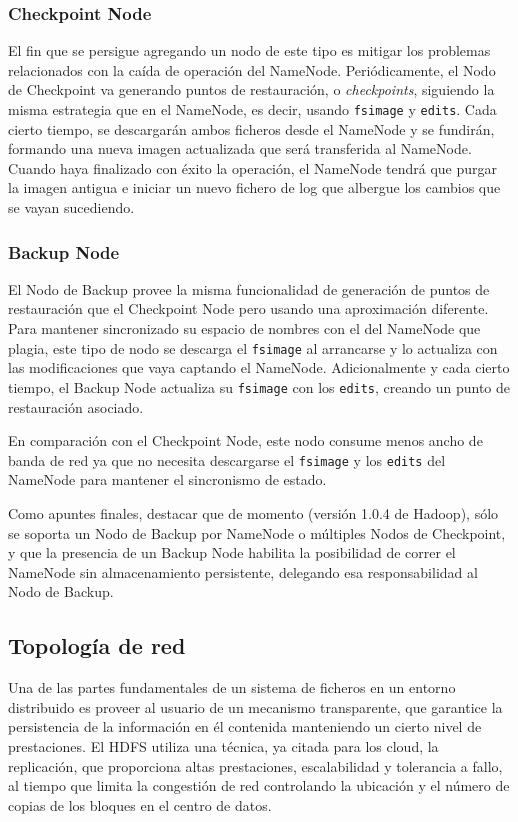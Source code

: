\subsubsection{Checkpoint Node}\label{subsubsec:checkpointnode}
\noindent El fin que se persigue agregando un nodo de este tipo es mitigar los problemas relacionados con la ca\'ida de operaci\'on del NameNode. Peri\'odicamente, el Nodo de Checkpoint va generando puntos de restauraci\'on, o \emph{checkpoints}, siguiendo la misma estrategia que en el NameNode, es decir, usando \texttt{fsimage} y \texttt{edits}. Cada cierto tiempo, se descargar\'an ambos ficheros desde el NameNode y se fundir\'an, formando una nueva imagen actualizada que ser\'a transferida al NameNode. Cuando haya finalizado con \'exito la operaci\'on, el NameNode tendr\'a que purgar la imagen antigua e iniciar un nuevo fichero de log que albergue los cambios que se vayan sucediendo.


\subsubsection{Backup Node}\label{subsubsec:backupnode}
\noindent El Nodo de Backup provee la misma funcionalidad de generaci\'on de puntos de restauraci\'on que el Checkpoint Node pero usando una aproximaci\'on diferente. Para mantener sincronizado su espacio de nombres con el del NameNode que plagia, este tipo de nodo se descarga el \texttt{fsimage} al arrancarse y lo actualiza con las modificaciones que vaya captando el NameNode. Adicionalmente y cada cierto tiempo, el Backup Node actualiza su \texttt{fsimage} con los \texttt{edits}, creando un punto de restauraci\'on asociado.\newline

En comparaci\'on con el Checkpoint Node, este nodo consume menos ancho de banda de red ya que no necesita descargarse el \texttt{fsimage} y los \texttt{edits} del NameNode para mantener el sincronismo de estado.\newline

Como apuntes finales, destacar que de momento (versi\'on 1.0.4 de Hadoop), s\'olo se soporta un Nodo de Backup por NameNode o m\'ultiples Nodos de Checkpoint, y que la presencia de un Backup Node habilita la posibilidad de correr el NameNode sin almacenamiento persistente, delegando esa res\-pon\-sa\-bi\-li\-dad al Nodo de Backup.


\subsection{Topolog\'ia de red}\label{subsec:topologiared}
\noindent Una de las partes fundamentales de un sistema de ficheros en un entorno distribuido es proveer al usuario de un mecanismo transparente, que garantice la persistencia de la informaci\'on en \'el contenida manteniendo un cierto nivel de prestaciones. El HDFS utiliza una t\'ecnica, ya citada para los cloud, la replicaci\'on, que proporciona altas prestaciones, escalabilidad y tolerancia a fallo, al tiempo que limita la congesti\'on de red controlando la ubicaci\'on y el n\'umero de copias de los bloques en el centro de datos.

